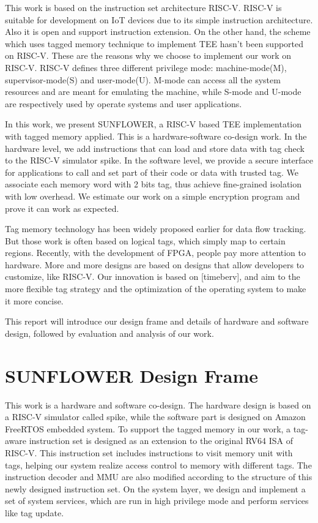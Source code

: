 \documentclass[conference]{IEEEtran}
\begin{document}
This work is based on the instruction set architecture RISC-V.\cite{RISCV} RISC-V is suitable for development on IoT devices due to its simple instruction architecture. Also it is open and support instruction extension. On the other hand, the scheme which uses tagged memory technique to implement TEE hasn't been supported on RISC-V. These are the reasons why we choose to implement our work on RISC-V. RISC-V defines three different privilege mode: machine-mode(M), supervisor-mode(S) and user-mode(U). M-mode can access all the system resources and are meant for emulating the machine, while S-mode and U-mode are respectively used by operate systems and user applications.

In this work, we present SUNFLOWER, a RISC-V based TEE implementation with tagged memory applied. This is a hardware-software co-design work. In the hardware level, we add instructions that can load and store data with tag check to the RISC-V simulator spike. In the software level, we provide a secure interface for applications to call and set part of their code or data with trusted tag. We associate each memory word with 2 bits tag, thus achieve fine-grained isolation with low overhead. We estimate our work on a simple encryption program and prove it can work as expected. 

Tag memory technology has been widely proposed earlier for data flow tracking. But those work is often based on logical tags, which simply map to certain regions. Recently, with the development of FPGA, people pay more attention to hardware. More and more designs are based on designs that allow developers to customize, like RISC-V. Our innovation is based on [timeberv], and aim to the more flexible tag strategy and the optimization of the operating system to make it more concise.

This report will introduce our design frame and details of hardware and software design, followed by evaluation and analysis of our work.




\section{SUNFLOWER Design Frame}
This work is a hardware and software co-design. The hardware design is based on a RISC-V simulator called spike, while the software part is designed on Amazon FreeRTOS embedded system. To support the tagged memory in our work, a tag-aware instruction set is designed as an extension to the original RV64 ISA of RISC-V. This instruction set includes instructions to visit memory unit with tags, helping our system realize access control to memory with different tags. The instruction decoder and MMU are also modified according to the structure of this newly designed instruction set. On the system layer, we design and implement a set of system services, which are run in high privilege mode and perform services like tag update.
\end{document}
